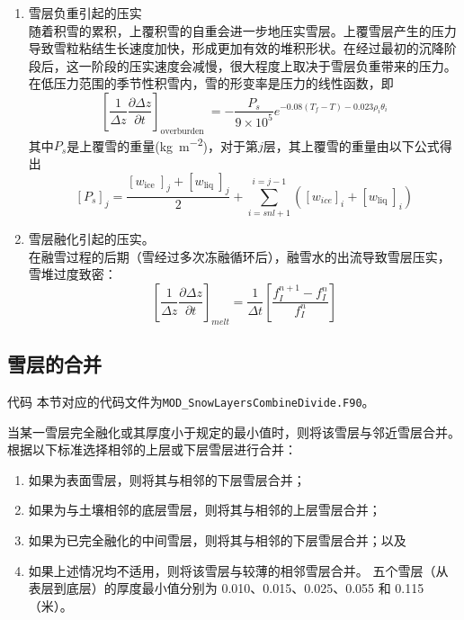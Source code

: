 \begin{enumerate}
\item 雪层负重引起的压实\\
随着积雪的累积，上覆积雪的自重会进一步地压实雪层。上覆雪层产生的压力导致雪粒粘结生长速度加快，形成更加有效的堆积形状。在经过最初的沉降阶段后，这一阶段的压实速度会减慢，很大程度上取决于雪层负重带来的压力。在低压力范围的季节性积雪内，雪的形变率是压力的线性函数，即
\begin{equation}
\left[\frac{1}{\Delta {z}} \frac{\partial \Delta {z}}{\partial {t}}\right]_{\text {overburden }}=-\frac{{P}_{{s}}}{9 \times 10^{5}} {e}^{-0.08\left(T_f-{T}\right)-0.023 \rho_{{i}} \theta_{{i}}}
\end{equation}
其中$P_{s}$是上覆雪的重量(\unit{kg.m^{-2}})，对于第$j$层，其上覆雪的重量由以下公式得出
\begin{equation}
\left[P_{s}\right]_{j}=\frac{\left[w_{\text {ice }}\right]_{j}+\left[w_{\text {liq }}\right]_{j}}{2}+\sum_{{i}={snl}+1}^{{i}={j}-1}\left(\left[{w}_{{ice}}\right]_{{i}}+\left[{w}_{\text {liq }}\right]_{{i}}\right)
\end{equation}

\item 雪层融化引起的压实。\\
在融雪过程的后期（雪经过多次冻融循环后），融雪水的出流导致雪层压实，雪堆过度致密：
\begin{equation}
\left[\frac{1}{\Delta {z}} \frac{\partial \Delta {z}}{\partial {t}}\right]_{{melt}}=\frac{1}{\Delta {t}}\left[\frac{{f}_{{I}}^{{n}+1}-{f}_{{I}}^{{n}}}{{f}_{{I}}^{{n}}}\right]
\end{equation}
\end{enumerate}


\subsection{雪层的合并}
\begin{mymdframed}{代码}
本节对应的代码文件为\texttt{MOD\_SnowLayersCombineDivide.F90}。
\end{mymdframed}

当某一雪层完全融化或其厚度小于规定的最小值时，则将该雪层与邻近雪层合并。根据以下标准选择相邻的上层或下层雪层进行合并：
\begin{enumerate}
\item 如果为表面雪层，则将其与相邻的下层雪层合并；
\item 如果为与土壤相邻的底层雪层，则将其与相邻的上层雪层合并；
\item 如果为已完全融化的中间雪层，则将其与相邻的下层雪层合并；以及
\item 如果上述情况均不适用，则将该雪层与较薄的相邻雪层合并。
五个雪层（从表层到底层）的厚度最小值分别为 0.010、0.015、0.025、0.055 和 0.115（米）。

\end{enumerate}


